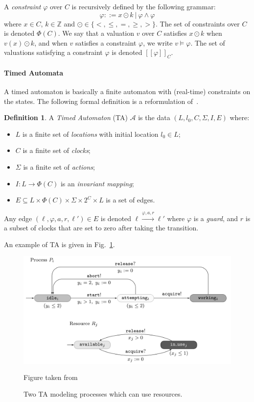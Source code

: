 \documentclass[11pt]{article}
\theoremstyle{definition}
\newtheorem{definition}{Definition}
\theoremstyle{remark}
\begin{document}
A \emph{constraint} $\varphi$ over $C$ is recursively defined by the following grammar:
\begin{equation*}
	\varphi ::= x \odot k\ |\ \varphi \land \varphi
\end{equation*}
where $x\in C$, $k \in \mathbb{Z}$ and $\odot \in \{<, \leq, =, \geq, >\}$.
The set of constraints over $C$ is denoted $\Phi(C)$.
We say that a valuation $v$ over $C$ satisfies $x \odot k$ when $v(x) \odot k$, and when $v$ satisfies a constraint $\varphi$, we write $v \models \varphi$. The set of valuations satisfying a constraint $\varphi$ is denoted $[\![\varphi]\!]_C$.


\paragraph{Timed Automata}\label{par:ta}
A timed automaton is basically a finite automaton with (real-time) constraints on the states.
The following formal definition is a reformulation of~\cite[Chapter 29.2, Definition 1]{handbook}.
\begin{definition}\label{def:ta}
	A \emph{Timed Automaton} (TA) $\mathcal{A}$ is the data $(L, l_0, C, \Sigma, I, E)$ where:
	\begin{itemize}
		\item $L$ is a finite set of \emph{locations} with initial location $l_0 \in L$;
		\item $C$ is a finite set of \emph{clocks};
		\item $\Sigma$ is a finite set of \emph{actions};
		\item $I \colon L \to \Phi(C)$ is an \emph{invariant mapping};
		\item $E \subseteq L \times \Phi(C) \times \Sigma \times 2^{C} \times L$ is a set of edges.
	\end{itemize}
	Any edge $(\ell, \varphi, a, r, \ell') \in E$ is denoted $\ell \xrightarrow{\varphi, a, r} \ell'$ where $\varphi$ is a \emph{guard}, and $r$ is a subset of clocks that are set to zero after taking the transition.
\end{definition}
An example of TA is given in Fig.~\ref{fig:ta_ex}.

\begin{figure}[ht]
\centering
\includegraphics[width=.75\textwidth]{../img/TAex.png}
\caption{Two TA modeling processes which can use resources.}\label{fig:ta_ex}
\tiny{Figure taken from \cite[Chapter 29.2]{handbook}}
\end{figure}
\end{document}
